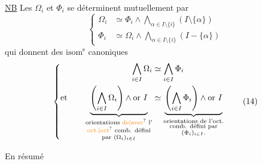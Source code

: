 \uline{NB} Les $\Omega_i$ et $\Phi_i$ se déterminent mutuellement par
\[
\left\{\begin{aligned}
 \Omega_i&\simeq\Phi_i\wedge\bigwedge_{\alpha\in I\setminus\{i\}}(I\setminus\{\alpha\})\\
 \Phi_i&\simeq\Omega_i\wedge\bigwedge_{\alpha\in I\setminus\{i\}}(I-\{\alpha\})
\end{aligned}\right.\tag*{(13)}
\]
qui donnent des $\mathrm{isom}^{\mathrm s}$ canoniques
\[
\left\{\begin{aligned}
 \bigwedge_{i\in I}\Omega_i&\simeq\bigwedge_{i\in I}\Phi_i\\
 \text{et}\qquad
 \underbrace{\left(\bigwedge_{i\in I}\Omega_i\right)\wedge\operatorname{or}\,I}
 _{\substack{\text{orientations \unsure{de|avec} l'}\\\text{\unsure{oct.|oct} comb. défini}\\\text{par }(\Omega_i)_{i\in I}}}
 &\simeq
 \underbrace{\left(\bigwedge_{i\in I}\Phi_i\right)\wedge\operatorname{or}\,I}
 _{\substack{\text{orientations de l'oct.}\\\text{comb. défini par}\\(\Phi_i)_{i\in I}.}}
\end{aligned}\right.\tag*{(14)}
\]

En résumé


